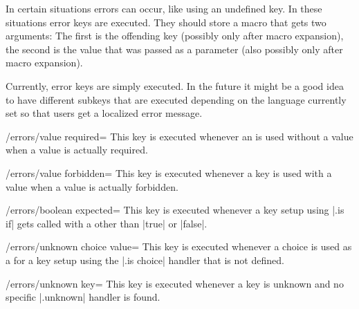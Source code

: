 In certain situations errors can occur, like using an undefined
key. In these situations error keys are executed. They should store a
macro that gets two arguments: The first is the offending key
(possibly only after macro expansion), the second is the value that
was passed as a parameter (also possibly only after macro expansion).

Currently, error keys are simply executed. In the future it might be a
good idea to have different subkeys that are executed depending on the
language currently set so that users get a localized error message.

\begin{key}{/errors/value required=}
  This key is executed whenever an  is used
  without a value when a value is actually required. 
\end{key}

\begin{key}{/errors/value forbidden=}
  This key is executed whenever a key is used with a value when a
  value is actually forbidden.
\end{key}

\begin{key}{/errors/boolean expected=}
  This key is executed whenever a key setup using |.is if| gets called
  with a  other than |true| or |false|.
\end{key}

\begin{key}{/errors/unknown choice value=}
  This key is executed whenever a choice is used as a  for
  a key setup using the |.is choice| handler that is not defined.
\end{key}

\begin{key}{/errors/unknown key=}
  This key is executed whenever a key is unknown and no specific
  |.unknown| handler is found.
\end{key}



